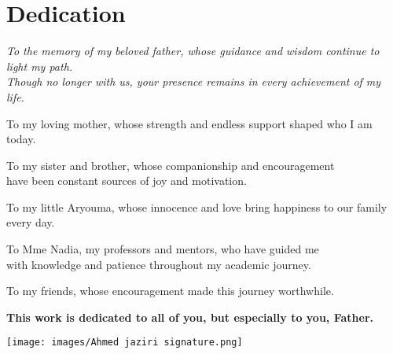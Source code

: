 \chapter*{\centering Dedication}

\begin{center}
{\itshape\large 
To the memory of my beloved father, whose guidance and wisdom continue to light my path. \\
Though no longer with us, your presence remains in every achievement of my life.

\vspace{0.8cm}

To my loving mother, whose strength and endless support shaped who I am today.

\vspace{0.8cm}

To my sister and brother, whose companionship and encouragement \\
have been constant sources of joy and motivation.

\vspace{0.8cm}

To my little Aryouma, whose innocence and love bring happiness to our family every day.

\vspace{0.8cm}

To Mme Nadia, my professors and mentors, who have guided me \\
with knowledge and patience throughout my academic journey.

\vspace{0.8cm}

To my friends, whose encouragement made this journey worthwhile.

\vspace{0.8cm}

\textbf{This work is dedicated to all of you, but especially to you, Father.}
}
\end{center}

\vspace{0.5cm}



\begin{flushright}
    \begin{minipage}{0.3\textwidth}
        \centering
        \texttt{[image: images/Ahmed jaziri signature.png]}\\
    \end{minipage}
\end{flushright}

\thispagestyle{empty} 
